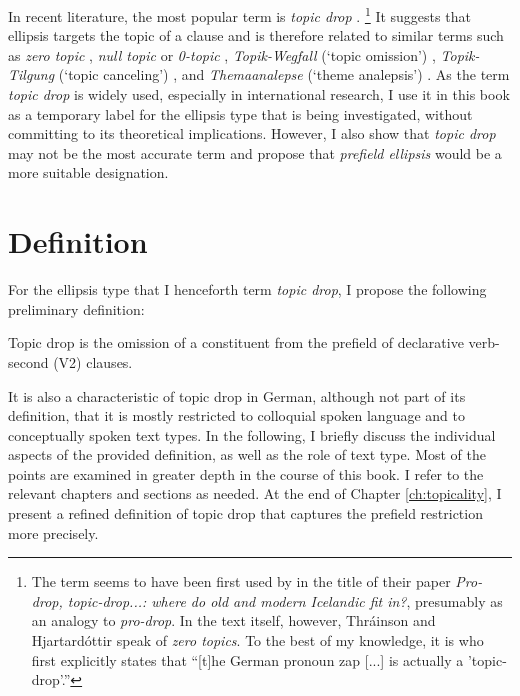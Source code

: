 In recent literature, the most popular term is \textit{topic drop} \citep{thrainson.hjartardottir1986,sigurdsson1989,haegeman1997,jaensch2005,ackema.neeleman2007,erteschik-shir2007,haegeman2007,reich2011,trutkowski2011,volodina2011,schalowski2015,trutkowski2016,helmer2016,helmer2017,ruppenhofer2018,freywald2020}.%
\footnote{The term seems to have been first used by \citet{thrainson.hjartardottir1986} in the title of their paper \textit{Pro-drop, topic-drop...: where do old and modern Icelandic fit in?}, presumably as an analogy to \textit{pro-drop}.
In the text itself, however, Thráinson and Hjartardóttir speak of \textit{zero topics}.
To the best of my knowledge, it is \citet[145]{sigurdsson1989} who first explicitly states that ``[t]he German pronoun zap [...] is actually a 'topic-drop'.''}
It suggests that ellipsis targets the topic of a clause and is therefore related to similar terms such as \textit{zero topic} \citep{huang1984}, \textit{null topic} or \textit{0-topic} \citep{fries1988, cardinaletti1990, eckert1998.diss}, \textit{Topik-Wegfall} (`topic omission') \citep{klein1993}, \textit{Topik-Tilgung} (`topic canceling') \citep{sternefeld1985}, and \textit{Themaanalepse} (`theme analepsis') \citep{zifonun.etal1997}.
As the term \textit{topic drop} is widely used, especially in international research, I use it in this book as a temporary label for the ellipsis type that is being investigated, without committing to its theoretical implications.
However, I also show that \textit{topic drop} may not be the most accurate term and propose that \textit{prefield ellipsis} would be a more suitable designation.

\section{Definition}\label{sec:definition}
For the ellipsis type that I henceforth term \textit{topic drop}, I propose the following preliminary definition:

\begin{theorem}\label{def:topic1} 
Topic drop is the omission of a constituent from the prefield of declarative verb-second (V2) clauses.
\end{theorem}

\noindent
It is also a characteristic of topic drop in German, although not part of its definition, that it is mostly restricted to colloquial spoken language and to conceptually spoken \citep{koch.oesterreicher1985} text types. 
In the following, I briefly discuss the individual aspects of the provided definition, as well as the role of text type.
Most of the points are examined in greater depth in the course of this book.
I refer to the relevant chapters and sections as needed.
At the end of Chapter \ref{ch:topicality}, I present a refined definition of topic drop that captures the prefield restriction more precisely.

